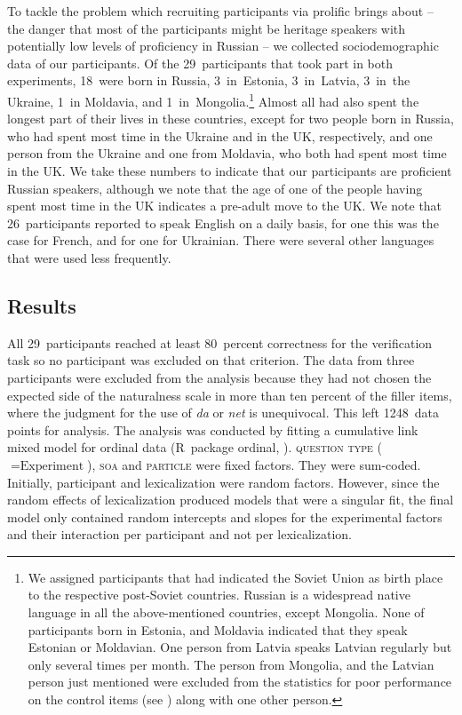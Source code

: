 \documentclass[output=paper,colorlinks,citecolor=brown]{langscibook}
\begin{document}
To tackle the problem which recruiting participants via prolific brings about -- the danger that most of the participants might be heritage speakers with potentially low levels of proficiency in Russian -- we collected sociodemographic data of our participants. Of the 29~participants that took part in both experiments, 18~were born in Russia, 3~in~Estonia, 3~in~Latvia, 3~in~the Ukraine, 1~in Moldavia, and 1~in~Mongolia.\footnote{We assigned participants that had indicated the Soviet Union as birth place to the respective post-Soviet countries. Russian is a widespread native language in all the above-mentioned countries, except Mongolia. None of participants born in Estonia, and Moldavia indicated that they speak Estonian or Moldavian. One person from Latvia speaks Latvian regularly but only several times per month. The person from Mongolia, and the Latvian person just mentioned were excluded from the statistics for poor performance on the control items (see ) along with one other person.} Almost all had also spent the longest part of their lives in these countries, except for two people born in Russia, who had spent most time in the Ukraine and in the UK, respectively, and one person from the Ukraine and one from Moldavia, who both had spent most time in the UK. We take these numbers to indicate that our participants are proficient Russian speakers, although we note that the age of one of the people having spent most time in the UK indicates a pre-adult move to the UK. We note that 26~participants reported to speak English on a daily basis, for one this was the case for French, and for one for Ukrainian. There were several other languages that were used less frequently.

\subsection{Results}\label{geist-repp:sec:results}\largerpage
All 29~participants reached at least 80~percent correctness for the verification task so no participant was excluded on that criterion. The data from three participants were excluded from the analysis because they had not chosen the expected side of the naturalness scale in more than ten percent of the filler items, where the judgment for the use of \textit{da} or \textit{net} is unequivocal. This left 1248~data points for analysis. The analysis was conducted by fitting a cumulative link mixed model for ordinal data (R~package ordinal, \citealt{Christensen2019}). \textsc{question type} ($=\text{Experiment}$), \textsc{soa} and \textsc{particle} were fixed factors. They were sum-coded. Initially, participant and lexicalization were random factors. However, since the random effects of lexicalization produced models that were a singular fit, the final model only contained random intercepts and slopes for the experimental factors and their interaction per participant and not per lexicalization.
\end{document}
